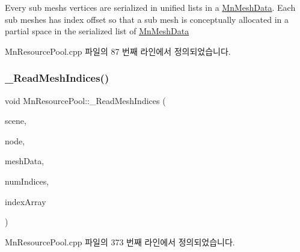 Every sub mesh\textquotesingle{}s vertices are serialized in unified lists in a \hyperlink{class_m_n_l_1_1_mn_mesh_data}{Mn\+Mesh\+Data}. Each sub meshes has index offset so that a sub mesh is conceptually allocated in a partial space in the serialized list of \hyperlink{class_m_n_l_1_1_mn_mesh_data}{Mn\+Mesh\+Data} 

Mn\+Resource\+Pool.\+cpp 파일의 87 번째 라인에서 정의되었습니다.

\mbox{\label{class_m_n_l_1_1_mn_resource_pool_ace158d455ad6830d0aaf82994237dbda}} 
\subsubsection{\texorpdfstring{\+\_\+\+Read\+Mesh\+Indices()}{\_ReadMeshIndices()}}
{\footnotesize\ttfamily void Mn\+Resource\+Pool\+::\+\_\+\+Read\+Mesh\+Indices (\begin{DoxyParamCaption}\item[{const ai\+Scene $\ast$}]{scene,  }\item[{const ai\+Node $\ast$}]{node,  }\item[{std\+::shared\+\_\+ptr$<$ \hyperlink{class_m_n_l_1_1_mn_mesh_data}{Mn\+Mesh\+Data} $>$ \&}]{mesh\+Data,  }\item[{U\+I\+NT}]{num\+Indices,  }\item[{std\+::vector$<$ U\+I\+NT $>$ \&}]{index\+Array }\end{DoxyParamCaption})\hspace{0.3cm}{\ttfamily [private]}}



Mn\+Resource\+Pool.\+cpp 파일의 373 번째 라인에서 정의되었습니다.

\mbox{\label{class_m_n_l_1_1_mn_resource_pool_a27987643db1cb3f0af6f912fb5d67404}} 
